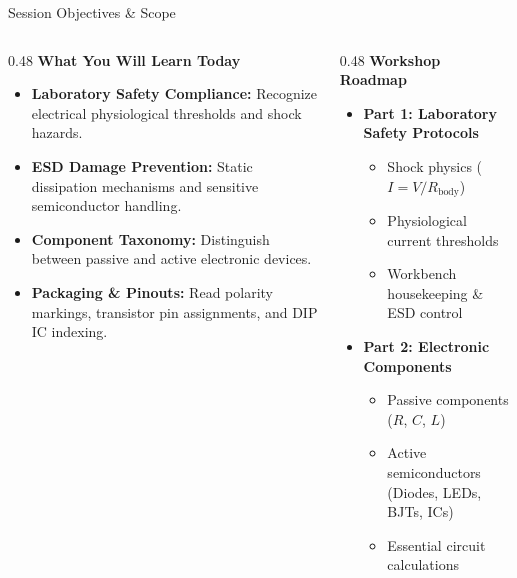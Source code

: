 \begin{frame}{Session Objectives \& Scope}
    \begin{columns}[T]
        \begin{column}{0.48\textwidth}
            \textbf{What You Will Learn Today}
            \begin{itemize}
                \item \textbf{Laboratory Safety Compliance:} Recognize electrical physiological thresholds and shock hazards.
                \item \textbf{ESD Damage Prevention:} Static dissipation mechanisms and sensitive semiconductor handling.
                \item \textbf{Component Taxonomy:} Distinguish between passive and active electronic devices.
                \item \textbf{Packaging \& Pinouts:} Read polarity markings, transistor pin assignments, and DIP IC indexing.
            \end{itemize}
        \end{column}
        
        \begin{column}{0.48\textwidth}
            \textbf{Workshop Roadmap}
            \begin{itemize}
                \item \textbf{Part 1: Laboratory Safety Protocols}
                \begin{itemize}
                    \item Shock physics ($I = V/R_{\text{body}}$)
                    \item Physiological current thresholds
                    \item Workbench housekeeping \& ESD control
                \end{itemize}
                \item \textbf{Part 2: Electronic Components}
                \begin{itemize}
                    \item Passive components ($R$, $C$, $L$)
                    \item Active semiconductors (Diodes, LEDs, BJTs, ICs)
                    \item Essential circuit calculations
                \end{itemize}
            \end{itemize}
        \end{column}
    \end{columns}
\end{frame}
